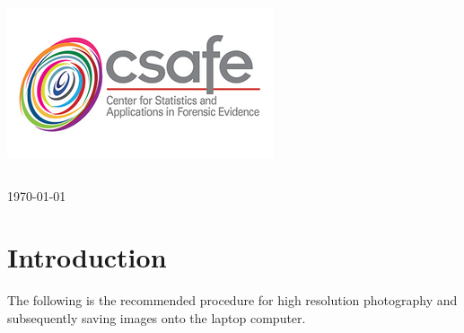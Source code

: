 \begin{titlepage}

\includegraphics[scale=.5]{Logo}\\[1cm]

\begin{center}
\begin{tabular}{ c   |   c } 
 
\end{tabular}
\end{center}

{\large \today}\\[2cm] %



\vfill %

 
\tableofcontents

\newpage

\vfill %

\end{titlepage}




\section{Introduction}

The following is the recommended procedure for high resolution photography and subsequently saving images onto the laptop computer. 

